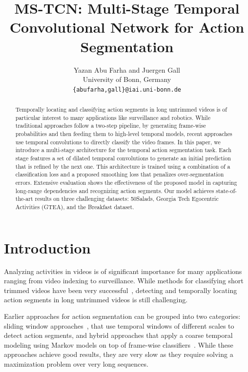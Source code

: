 \documentclass[10pt,twocolumn,letterpaper]{article}
\begin{document}
\title{MS-TCN: Multi-Stage Temporal Convolutional Network for Action Segmentation}

\author{Yazan Abu Farha and Juergen Gall\\
University of Bonn, Germany\\
{\tt\small \{abufarha,gall\}@iai.uni-bonn.de}
}

\maketitle

\begin{abstract}
   Temporally locating and classifying action segments in long untrimmed 
videos is of particular interest to many applications like surveillance 
and robotics. While traditional approaches follow a two-step pipeline, 
by generating frame-wise probabilities and then feeding them to high-level 
temporal models, recent approaches use temporal convolutions to directly 
classify the video frames. In this paper, we introduce a multi-stage 
architecture for the temporal action segmentation task. Each stage features 
a set of dilated temporal convolutions to generate an initial prediction that 
is refined by the next one. This architecture is trained using a combination 
of a classification loss and a proposed smoothing loss that penalizes 
over-segmentation errors. Extensive evaluation shows the effectiveness of the 
proposed model in capturing long-range dependencies and recognizing action 
segments. Our model achieves state-of-the-art results on three challenging 
datasets: 50Salads, Georgia Tech Egocentric Activities (GTEA), and the Breakfast dataset.
\end{abstract}

\section{Introduction}
Analyzing activities in videos is of significant importance for 
many applications ranging from video indexing to surveillance. 
While methods for classifying short trimmed videos have been very 
successful~\cite{carreira2017quo, feichtenhofer2016spatiotemporal}, 
detecting and temporally locating action segments in long untrimmed 
videos is still challenging.

Earlier approaches for action segmentation can be grouped into two categories: 
sliding window approaches~\cite{rohrbach2012database, karaman2014fast, 
oneata2014lear}, that use temporal windows of different scales to detect 
action segments, and hybrid approaches that apply a coarse temporal modeling using 
Markov models on top of frame-wise classifiers~\cite{kuehne2016end, lea2016segmental, 
richard2017weakly}. While these approaches achieve good results, they are very 
slow as they require solving a maximization problem over very long sequences.
\end{document}
